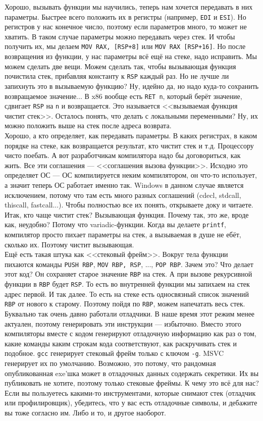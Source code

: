 \documentclass{article}
\newcommand{\asm}[1]{\texttt{#1}}
\begin{document}
    Хорошо, вызывать функции мы научились, теперь нам хочется передавать в них параметры. Быстрее всего положить их в регистры (например, \asm{EDI} и \asm{ESI}). Но регистров у нас конечное число, поэтому если параметров много, то может не хватить. В таком случае параметры можно передавать через стек. И чтобы получить их, мы делаем \asm{MOV RAX, [RSP+8]} или \asm{MOV RAX [RSP+16]}. Но после возвращения из функции, у нас параметры всё ещё на стеке, надо исправить. Мы можем сделать две вещи. Можем сделать так, чтобы вызывающая функция почистила стек, прибавляя константу к \asm{RSP} каждый раз. Но не лучше ли запихнуть это в вызываемую функцию? Ну, идейно да, но надо куда-то сохранить возвращаемое значение... В x86 вообще есть \asm{RET n}, который берёт значение, сдвигает \asm{RSP} на \asm{n} и возвращается. Это называется <<вызываемая функция чистит стек>>. Осталось понять, что делать с локальными переменными? Ну, их можно положить выше на стек после адреса возврата.\\
    Хорошо, а кто определяет, как передавать параметры. В каких регистрах, в каком порядке на стеке, как возвращается результат, кто чистит стек и т.д. Процессору чисто поебать. А вот разработчикам компилятора надо бы договориться, как жить. Все эти соглашения --- <<соглашения вызова функции>>. Исходно это определяет ОС --- ОС компилируется неким компилятором, он что-то использует, а значит теперь ОС работает именно так. Windows в данном случае является исключением, потому что там есть много разных соглашений (cdecl, stdcall, thiscall, fastcall...). Чтобы полностью все их понять, открываете доку и читаете. Итак, кто чаще чистит стек? Вызывающая функция. Почему так, это же, вроде как, неудобно? Потому что variadic-функции. Когда вы делаете \texttt{printf}, компилятор просто пихает параметры на стек, а вызываемая в душе не ебёт, сколько их. Поэтому чистит вызывающая.\\
    Ещё есть такая штука как <<стековый фрейм>>. Вокруг тела функции пихаются команды \asm{PUSH RBP}, \asm{MOV RBP, RSP}, ..., \asm{POP RBP}. Зачем это? Что делает этот код? Он сохраняет старое значение \asm{RBP} на стек. А при вызове рекурсивной функции в \asm{RBP} будет \asm{RSP}. То есть во внутренней функции мы запихаем на стек адрес первой. И так далее. То есть на стеке есть односвязный список значений \asm{RBP} от нового к старому. Поэтому пойдя по \asm{RBP}, можем напечатать весь стек. Буквально так очень давно работали отладчики. В наше время этот режим менее актуален, поэтому генерировать эти инструкции --- избыточно. Вместо этого компиляторы вместе с кодом генерируют отладочную информацию как раз о том, какие команды каким строкам кода соответствуют, как раскручивать стек и подобное. \texttt{gcc} генерирует стековый фрейм только с ключом \texttt{-g}. MSVC генерирует их по умолчанию. Возможно, это потому, что рандомная опубликованная exe'шка может в отладочных данных содержать секретики. Их вы публиковать не хотите, поэтому только стековые фреймы. К чему это всё для нас? Если вы пользуетесь какими-то инструментами, которые снимают стек (отладчик или профилировщик), убедитесь, что у вас есть отладочные символы, и дебажите вы тоже согласно им. Либо и то, и другое наоборот.\\
\end{document}
